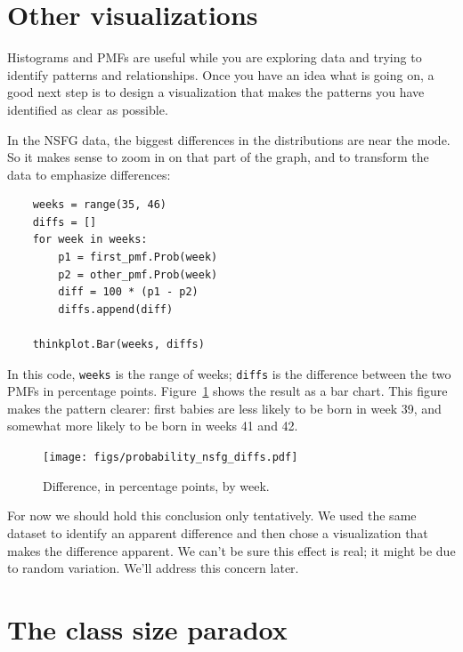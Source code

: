 \documentclass[12pt]{book}
\theoremstyle{exercise}
\begin{document}
\section{Other visualizations}%
\label{visualization}

Histograms and PMFs are useful while you are exploring data and
trying to identify patterns and relationships.
Once you have an idea what is going on, a good next step is to
design a visualization that makes the patterns you have identified
as clear as possible.%
%

In the NSFG data, the biggest differences in the distributions are
near the mode.  So it makes sense to zoom in on that part of the
graph, and to transform the data to emphasize differences:%
%

\begin{verbatim}
    weeks = range(35, 46)
    diffs = []
    for week in weeks:
        p1 = first_pmf.Prob(week)
        p2 = other_pmf.Prob(week)
        diff = 100 * (p1 - p2)
        diffs.append(diff)

    thinkplot.Bar(weeks, diffs)
\end{verbatim}

In this code, {\tt weeks} is the range of weeks; {\tt diffs} is the
difference between the two PMFs in percentage points.
Figure~\ref{probability_nsfg_diffs} shows the result as a bar chart.
This figure makes the pattern clearer: first babies are less likely to
be born in week 39, and somewhat more likely to be born in weeks 41
and 42.%

\begin{figure}
\centerline{\texttt{[image: figs/probability\_nsfg\_diffs.pdf]}}
\caption{Difference, in percentage points, by week.}%
\label{probability_nsfg_diffs}
\end{figure}

For now we should hold this conclusion only tentatively.
We used the same dataset to identify an
apparent difference and then chose a visualization that makes the
difference apparent.  We can't be sure this effect is real;
it might be due to random variation.  We'll address this concern
later.


\section{The class size paradox}%
\end{document}
